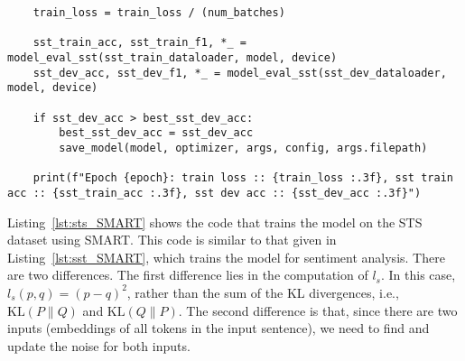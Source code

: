 \begin{lstlisting}
    train_loss = train_loss / (num_batches)

    sst_train_acc, sst_train_f1, *_ = model_eval_sst(sst_train_dataloader, model, device)
    sst_dev_acc, sst_dev_f1, *_ = model_eval_sst(sst_dev_dataloader, model, device)

    if sst_dev_acc > best_sst_dev_acc:
        best_sst_dev_acc = sst_dev_acc
        save_model(model, optimizer, args, config, args.filepath)

    print(f"Epoch {epoch}: train loss :: {train_loss :.3f}, sst train acc :: {sst_train_acc :.3f}, sst dev acc :: {sst_dev_acc :.3f}")
\end{lstlisting}

Listing~\ref{lst:sts_SMART} shows the code that trains the model on the STS dataset using SMART. This code is similar to that given in Listing~\ref{lst:sst_SMART}, which trains the model for sentiment analysis. There are two differences. The first difference lies in the computation of $l_s$. In this case, $l_s(p, q) = (p - q)^2$, rather than the sum of the KL divergences, i.e., $\text{KL}(P \| Q)$ and $\text{KL}(Q \| P)$. The second difference is that, since there are two inputs (embeddings of all tokens in the input sentence), we need to find and update the noise for both inputs.

